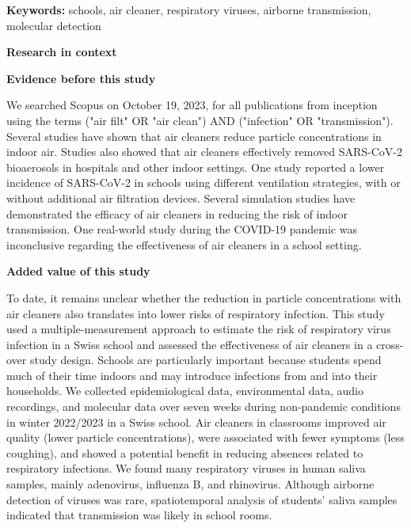 \documentclass[fleqn,11pt]{wlscirep}
\begin{document}
\flushbottom
\maketitle

\vspace{2em}

\vspace{0.5em}

\noindent\textbf{Keywords:} schools, air cleaner, respiratory viruses, airborne transmission, molecular detection

\thispagestyle{empty}
\sloppy
\raggedbottom

\newpage

\noindent\textbf{\Large{Research in context}} \medskip

\noindent \textbf{Evidence before this study} \smallskip

\noindent We searched Scopus on October 19, 2023, for all publications from inception using the terms ("air filt" OR "air clean") AND ("infection" OR "transmission"). Several studies have shown that air cleaners reduce particle concentrations in indoor air. Studies also showed that air cleaners effectively removed SARS-CoV-2 bioaerosols in hospitals and other indoor settings. One study reported a lower incidence of SARS-CoV-2 in schools using different ventilation strategies, with or without additional air filtration devices. Several simulation studies have demonstrated the efficacy of air cleaners in reducing the risk of indoor transmission. One real-world study during the COVID-19 pandemic was inconclusive regarding the effectiveness of air cleaners in a school setting. \medskip

\noindent \textbf{Added value of this study} \smallskip

\noindent To date, it remains unclear whether the reduction in particle concentrations with air cleaners also translates into lower risks of respiratory infection. This study used a multiple-measurement approach to estimate the risk of respiratory virus infection in a Swiss school and assessed the effectiveness of air cleaners in a cross-over study design. Schools are particularly important because students spend much of their time indoors and may introduce infections from and into their households. We collected epidemiological data, environmental data, audio recordings, and molecular data over seven weeks during non-pandemic conditions in winter 2022/2023 in a Swiss school. Air cleaners in classrooms improved air quality (lower particle concentrations), were associated with fewer symptoms (less coughing), and showed a potential benefit in reducing absences related to respiratory infections. We found many respiratory viruses in human saliva samples, mainly adenovirus, influenza B, and rhinovirus. Although airborne detection of viruses was rare, spatiotemporal analysis of students' saliva samples indicated that transmission was likely in school rooms. \medskip
\end{document}
